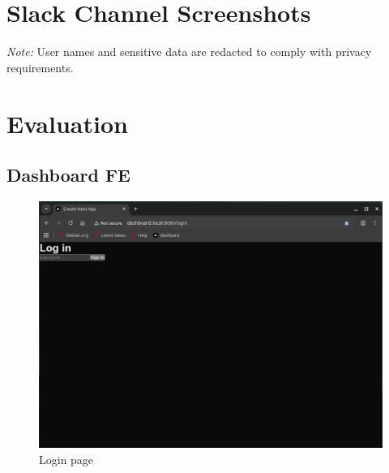 \documentclass[11pt, a4paper, oneside, listof=totoc]{scrartcl}
\begin{document}
        \clearpage

        \section{Slack Channel Screenshots}\label{app:slack}

            \noindent\textit{Note:} User names and sensitive data are redacted to comply with privacy requirements.

        \clearpage
        
        \section{Evaluation}\label{app:eval}
            \subsection{Dashboard FE}\label{appsub:dashboardfe}
                \begin{figure}[h!]
                    \centering
                    \includegraphics[width=\textwidth]{screenshots/eval/dashboardfe/dashboardfe-login-page.png}
                    \caption{Login page}\label{fig:dashboardfe-login-page}
                \end{figure}
\end{document}
